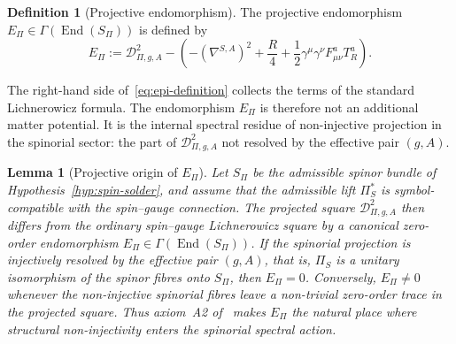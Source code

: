 \documentclass[11pt,a4paper]{article}
\newtheorem{lemma}[theorem]{Lemma}
\theoremstyle{definition}
\newtheorem{definition}[theorem]{Definition}
\theoremstyle{remark}
\begin{document}
    \begin{definition}[Projective endomorphism]
      \label{def:projective-endomorphism}
      The projective endomorphism $E_\Pi \in \Gamma(\operatorname{End}(S_\Pi))$ is
      defined by
      \begin{equation}
        \label{eq:epi-definition}
        E_\Pi
        :=
        \mathcal{D}_{\Pi,g,A}^2
        -
        \left(
          -(\nabla^{S,A})^2
        + \frac{R}{4}
          + \frac{1}{2}\gamma^\mu\gamma^\nu F^a_{\mu\nu} T^a_R
        \right).
      \end{equation}
    \end{definition}

    The right-hand side of~\eqref{eq:epi-definition} collects the terms of the
    standard Lichnerowicz formula.
    The endomorphism $E_\Pi$ is therefore not an additional matter potential.
    It is the internal spectral residue of non-injective projection in the spinorial
    sector: the part of $\mathcal{D}_{\Pi,g,A}^2$ not resolved by the effective
    pair $(g, A)$.

    \begin{lemma}[Projective origin of $E_\Pi$]
      \label{lem:projective-endomorphism}
      Let $S_\Pi$ be the admissible spinor bundle of Hypothesis~\ref{hyp:spin-solder}, and assume
      that the admissible lift $\Pi_S^*$ is symbol-compatible with the spin--gauge
      connection.
      The projected square $\mathcal{D}_{\Pi,g,A}^2$ then differs from the ordinary
      spin--gauge Lichnerowicz square by a canonical zero-order endomorphism
      $E_\Pi \in \Gamma(\operatorname{End}(S_\Pi))$.
      If the spinorial projection is injectively resolved by the effective pair $(g,A)$, that is, $\Pi_S$ is a unitary
      isomorphism of the spinor fibres onto $S_\Pi$,
      then $E_\Pi = 0$.
      Conversely, $E_\Pi \neq 0$ whenever the non-injective spinorial fibres leave a
      non-trivial zero-order trace in the projected square.
      Thus axiom~A2 of~\cite{Beau2026m} makes $E_\Pi$ the natural place where
      structural non-injectivity enters the spinorial spectral action.
    \end{lemma}
\end{document}
